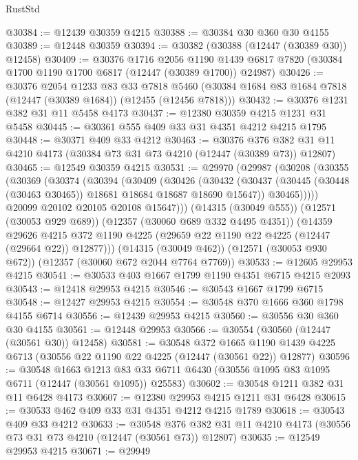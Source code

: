 \begin{lexlean}{RustStd}
\begin{coremodule}
@30384 := @12439 @30359 @4215
@30388 := @30384 @30 @360 @30 @4155
@30389 := @12448 @30359
@30394 := @30382 (@30388 (@12447 (@30389 @30)) @12458)
@30409 := @30376
    @1716
    @2056
    @1190
    @1439
    @6817
    @7820
    (@30384 @1700 @1190 @1700 @6817 (@12447 (@30389 @1700)) @24987)
@30426 := @30376
    @2054
    @1233
    @83
    @33
    @7818
    @5460
    (@30384 @1684 @83 @1684 @7818 (@12447 (@30389 @1684)) (@12455 (@12456 @7818)))
@30432 := @30376 @1231 @382 @31 @11 @5458 @4173
@30437 := @12380 @30359 @4215 @1231 @31 @5458
@30445 := @30361 @555 @409 @33 @31 @4351 @4212 @4215 @1795
@30448 := @30371 @409 @33 @4212
@30463 := @30376
    @376
    @382
    @31
    @11
    @4210
    @4173
    (@30384 @73 @31 @73 @4210 (@12447 (@30389 @73)) @12807)
@30465 := @12549 @30359 @4215
@30531 := @29970
    (@29987
      (@30208
        (@30355
          (@30369
            (@30374
              (@30394
                (@30409
                  (@30426
                    (@30432
                      (@30437 (@30445 (@30448 (@30463 @30465)) @18681 @18684 @18687 @18690 @15647))
                      @30465)))))
            @20099
            @20102
            @20105
            @20108
            @15647)))
      (@14315 (@30049 @555))
      (@12571 (@30053 @929 @689))
      (@12357 (@30060 @689 @332 @4495 @4351))
      (@14359
        @29626
        @4215
        @372
        @1190
        @4225
        (@29659 @22 @1190 @22 @4225 (@12447 (@29664 @22)) @12877)))
    (@14315 (@30049 @462))
    (@12571 (@30053 @930 @672))
    (@12357 (@30060 @672 @2044 @7764 @7769))
@30533 := @12605 @29953 @4215
@30541 := @30533 @403 @1667 @1799 @1190 @4351 @6715 @4215 @2093
@30543 := @12418 @29953 @4215
@30546 := @30543 @1667 @1799 @6715
@30548 := @12427 @29953 @4215
@30554 := @30548 @370 @1666 @360 @1798 @4155 @6714
@30556 := @12439 @29953 @4215
@30560 := @30556 @30 @360 @30 @4155
@30561 := @12448 @29953
@30566 := @30554 (@30560 (@12447 (@30561 @30)) @12458)
@30581 := @30548
    @372
    @1665
    @1190
    @1439
    @4225
    @6713
    (@30556 @22 @1190 @22 @4225 (@12447 (@30561 @22)) @12877)
@30596 := @30548
    @1663
    @1213
    @83
    @33
    @6711
    @6430
    (@30556 @1095 @83 @1095 @6711 (@12447 (@30561 @1095)) @25583)
@30602 := @30548 @1211 @382 @31 @11 @6428 @4173
@30607 := @12380 @29953 @4215 @1211 @31 @6428
@30615 := @30533 @462 @409 @33 @31 @4351 @4212 @4215 @1789
@30618 := @30543 @409 @33 @4212
@30633 := @30548
    @376
    @382
    @31
    @11
    @4210
    @4173
    (@30556 @73 @31 @73 @4210 (@12447 (@30561 @73)) @12807)
@30635 := @12549 @29953 @4215
@30671 := @29949

\end{coremodule}
\end{lexlean}
